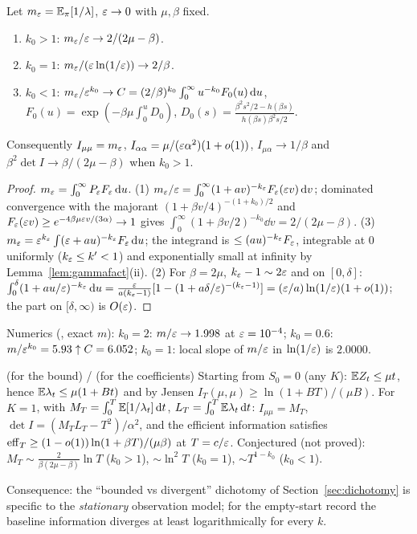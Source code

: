 \begin{theorem}[asymptotics of the baseline information, $K=1$]\label{thm:A}\Pt{}
Let $m_\varepsilon=\mathbb{E}_\pi[1/\lambda]$, $\varepsilon\to0$ with $\mu,\beta$ fixed.
\begin{enumerate}[label=(\arabic*),nosep]
\item $k_0>1$: $m_\varepsilon/\varepsilon\to2/(2\mu-\beta)$.
\item $k_0=1$: $m_\varepsilon/(\varepsilon\ln(1/\varepsilon))\to2/\beta$.
\item $k_0<1$: $m_\varepsilon/\varepsilon^{k_0}\to C=(2/\beta)^{k_0}\int_0^\infty u^{-k_0}F_0(u)\,\mathrm d u$, $F_0(u)=\exp(-\beta\mu\int_0^uD_0)$, $D_0(s)=\frac{\beta^2s^2/2-h(\beta s)}{h(\beta s)\beta^2s/2}$.
\end{enumerate}
Consequently $I_{\mu\mu}=m_\varepsilon$, $I_{\alpha\alpha}=\mu/(\varepsilon\alpha^2)(1+o(1))$, $I_{\mu\alpha}\to1/\beta$ and $\beta^2\det I\to\beta/(2\mu-\beta)$ when $k_0>1$.
\end{theorem}
\begin{proof}
$m_\varepsilon=\int_0^\infty P_\varepsilon F_\varepsilon\,\mathrm d u$.
(1) $m_\varepsilon/\varepsilon=\int_0^\infty(1+av)^{-k_\varepsilon}F_\varepsilon(\varepsilon v)\,\mathrm d v$; dominated convergence with the majorant $(1+\beta v/4)^{-(1+k_0)/2}$ and $F_\varepsilon(\varepsilon v)\ge e^{-4\beta\mu\varepsilon v/(3\alpha)}\to1$ gives $\int_0^\infty(1+\beta v/2)^{-k_0}\dd v=2/(2\mu-\beta)$.
(3) $m_\varepsilon=\varepsilon^{k_\varepsilon}\int(\varepsilon+au)^{-k_\varepsilon}F_\varepsilon\,\mathrm d u$; the integrand is $\le(au)^{-k_\varepsilon}F_\varepsilon$, integrable at $0$ uniformly ($k_\varepsilon\le k'<1$) and exponentially small at infinity by Lemma~\ref{lem:gammafact}(ii).
(2) For $\beta=2\mu$, $k_\varepsilon-1\sim2\varepsilon$ and on $[0,\delta]$: $\int_0^\delta(1+au/\varepsilon)^{-k_\varepsilon}\,\mathrm d u=\frac{\varepsilon}{a(k_\varepsilon-1)}[1-(1+a\delta/\varepsilon)^{-(k_\varepsilon-1)}]=(\varepsilon/a)\ln(1/\varepsilon)(1+o(1))$; the part on $[\delta,\infty)$ is $O(\varepsilon)$.
\end{proof}
Numerics (\Nt{}, exact $m$): $k_0=2$: $m/\varepsilon\to1.998$ at $\varepsilon=10^{-4}$; $k_0=0.6$: $m/\varepsilon^{k_0}=5.93\uparrow C=6.052$; $k_0=1$: local slope of $m/\varepsilon$ in $\ln(1/\varepsilon)$ is $2.0000$.

\begin{proposition}\label{prop:cold}\Pt{} (for the bound) / \Nt{} (for the coefficients)
Starting from $S_0=0$ (any $K$): $\mathbb{E} Z_t\le\mu t$, hence $\mathbb{E}\lambda_t\le\mu(1+Bt)$ and by Jensen
$I_T(\mu,\mu)\ge\ln(1+BT)/(\mu B)$.
For $K=1$, with $M_T=\int_0^T\mathbb{E}[1/\lambda_t]\,\mathrm d t$, $L_T=\int_0^T\mathbb{E}\lambda_t\,\mathrm d t$: $I_{\mu\mu}=M_T$, $\det I=(M_TL_T-T^2)/\alpha^2$, and the efficient information satisfies $\mathrm{eff}_T\ge(1-o(1))\ln(1+\beta T)/(\mu\beta)$ at $T=c/\varepsilon$.
Conjectured (not proved): $M_T\sim\frac{2}{\beta(2\mu-\beta)}\ln T$ ($k_0>1$), $\sim\ln^2T$ ($k_0=1$), $\sim T^{1-k_0}$ ($k_0<1$).
\end{proposition}
Consequence: the ``bounded vs divergent'' dichotomy of Section~\ref{sec:dichotomy} is specific to the \emph{stationary} observation model; for the empty-start record the baseline information diverges at least logarithmically for every $k$.

